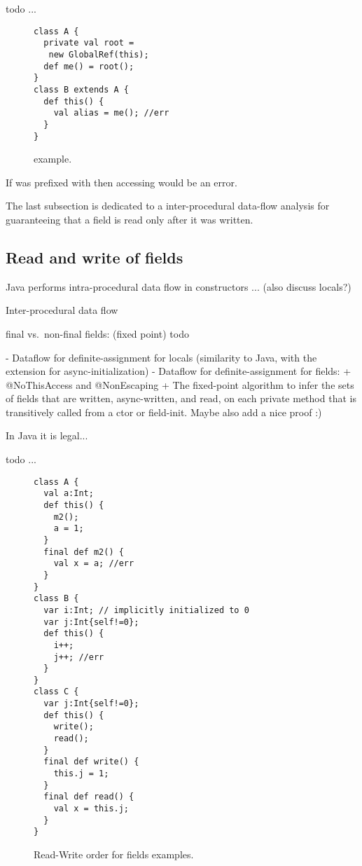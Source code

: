  todo ...

\begin{figure}
\begin{lstlisting}
class A {
  private val root =
   new GlobalRef(this);
  def me() = root();
}
class B extends A {
  def this() {
    val alias = me(); //err
  }
}
\end{lstlisting}
\caption{ example.
    }
\label{Figure:GlobalRef}
\end{figure}

If  was prefixed with
then accessing  would be an error.



The last subsection is dedicated to a inter-procedural data-flow analysis for guaranteeing
    that a field is read only after it was written.

\subsection{Read and write of fields}
\label{Section:Read-write-rules}
Java performs intra-procedural data flow in constructors ...
(also discuss locals?)

Inter-procedural data flow

final vs.\ non-final fields:
(fixed point)
todo

- Dataflow for definite-assignment for locals (similarity to Java, with the extension for async-initialization)
- Dataflow for definite-assignment for fields:
  + @NoThisAccess and @NonEscaping
  + The fixed-point algorithm to infer the sets of fields that are written, async-written, and read, on each private method that is transitively called from a ctor or field-init. Maybe also add a nice proof :)


In Java it is legal...

 todo ...

\begin{figure}
\begin{lstlisting}
class A {
  val a:Int;
  def this() {
    m2();
    a = 1;
  }
  final def m2() {
    val x = a; //err
  }
}
class B {
  var i:Int; // implicitly initialized to 0
  var j:Int{self!=0};
  def this() {
    i++;
    j++; //err
  }
}
class C {
  var j:Int{self!=0};
  def this() {
    write();
    read();
  }
  final def write() {
    this.j = 1;
  }
  final def read() {
    val x = this.j;
  }
}
\end{lstlisting}
\caption{Read-Write order for fields examples.
    }
\label{Figure:Read-Write-Order}
\end{figure}



